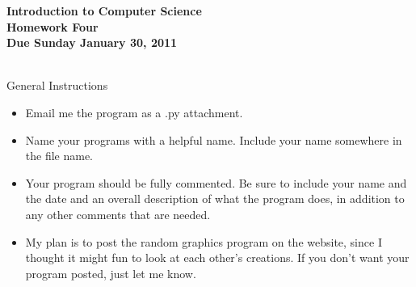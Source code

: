 \documentclass[12pt]{article}
\begin{document}
\pagestyle{empty}
 
\begin{center}
{\large {\bf Introduction to Computer Science}}\\
\medskip
{\large {\bf Homework Four}}\\
\medskip
{ {\bf Due Sunday January 30, 2011}}\\ 
\end{center}

\hspace{2mm}\\

\noindent General Instructions

\begin{itemize}
\setlength{\itemsep}{-1mm}
  \item Email me the program as a .py attachment.
  \item Name your programs with a helpful name.  Include your name
    somewhere in the file name.
  \item Your program should be fully commented.  Be sure to include
    your name and the date and an overall description of what the
    program does, in addition to any other comments that are needed. 
  \item My plan is to post the random graphics program on the website,
    since I thought it might fun to look at each other's creations.
    If you don't want your program posted, just let me know. \\
\end{itemize}
\end{document}
